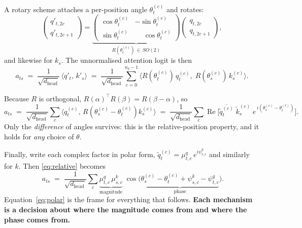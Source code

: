 \documentclass[11pt]{article}
\newcommand{\hd}{d_{\mathrm{head}}}
\newcommand{\nb}{n_b}
\begin{document}
A rotary scheme attaches a per-position angle $\theta_t^{(c)}$ and rotates:
\begin{equation}
  \label{eq:rot}
  \begin{pmatrix} q'_{t,2c} \\ q'_{t,2c+1}\end{pmatrix}
  =
  \underbrace{\begin{pmatrix}
    \cos\theta_t^{(c)} & -\sin\theta_t^{(c)}\\
    \sin\theta_t^{(c)} & \phantom{-}\cos\theta_t^{(c)}
  \end{pmatrix}}_{R(\theta_t^{(c)})\,\in\,SO(2)}
  \begin{pmatrix} q_{t,2c}\\ q_{t,2c+1}\end{pmatrix},
\end{equation}
and likewise for $k_s$. The unnormalised attention logit is then
\begin{equation}
  \label{eq:score}
  a_{ts}
  \;=\;\frac{1}{\sqrt{\hd}}\,\langle q'_t,\, k'_s\rangle
  \;=\;\frac{1}{\sqrt{\hd}}\sum_{c=0}^{\nb-1}
        \big\langle R(\theta_t^{(c)})\,q_t^{(c)},\; R(\theta_s^{(c)})\,k_s^{(c)}\big\rangle .
\end{equation}

Because $R$ is orthogonal, $R(\alpha)^{\!\top} R(\beta) = R(\beta-\alpha)$, so
\begin{equation}
  \label{eq:relative}
  a_{ts}
  \;=\;\frac{1}{\sqrt{\hd}}\sum_c
       \big\langle q_t^{(c)},\, R\!\left(\theta_s^{(c)}-\theta_t^{(c)}\right) k_s^{(c)}\big\rangle
  \;=\;\frac{1}{\sqrt{\hd}}\sum_c
       \operatorname{Re}\!\Big[\overline{\tilde q_t^{(c)}}\;\tilde k_s^{(c)}\;
         e^{\,i(\theta_s^{(c)}-\theta_t^{(c)})}\Big].
\end{equation}
Only the \emph{difference} of angles survives: this is the relative-position
property, and it holds for \emph{any} choice of $\theta$.

Finally, write each complex factor in polar form,
$\tilde q_t^{(c)} = \mu^q_{t,c}\,e^{i\psi^q_{t,c}}$ and similarly for $k$.
Then \eqref{eq:relative} becomes
\begin{equation}
  \label{eq:polar}
  \boxed{\;
  a_{ts} \;=\; \frac{1}{\sqrt{\hd}}\sum_c
     \underbrace{\mu^q_{t,c}\,\mu^k_{s,c}}_{\text{magnitude}}\;
     \cos\!\big(\underbrace{\theta_s^{(c)}-\theta_t^{(c)} + \psi^k_{s,c}-\psi^q_{t,c}}_{\text{phase}}\big).}
\end{equation}
Equation~\eqref{eq:polar} is the frame for everything that follows. \textbf{Each
mechanism is a decision about where the magnitude comes from and where the phase
comes from.}
\end{document}
